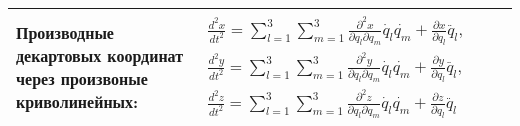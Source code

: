 \documentclass{article}
\begin{document}
\begin{tabular}{ |p{3.8cm}|p{5.7cm}|p{3.8cm}|p{5.7cm}|  }
\hline
Производные декартовых координат через произвоные криволинейных:             &  %
$\begin{aligned}
\frac{d^2 x}{d t^2} = \sum_{l=1}^3 \sum_{m=1}^3
\frac{\partial^2 x}{\partial q_l \partial q_m}
\dot{q_l} \dot{q_m} + \frac{\partial x}{\partial q_l} \ddot{q_l},  \\
\frac{d^2 y}{d t^2} = \sum_{l=1}^3 \sum_{m=1}^3
\frac{\partial^2 y}{\partial q_l \partial q_m}
\dot{q_l} \dot{q_m} + \frac{\partial y}{\partial q_l} \ddot{q_l},  \\
\frac{d^2 z}{d t^2} = \sum_{l=1}^3 \sum_{m=1}^3
\frac{\partial^2 z}{\partial q_l \partial q_m}
\dot{q_l} \dot{q_m} + \frac{\partial z}{\partial q_l} \ddot{q_l}
\end{aligned}$                                                               &  %
                                                                             &  %
                                                                             \\ %
\hline
\end{tabular}

\newpage
\end{document}
